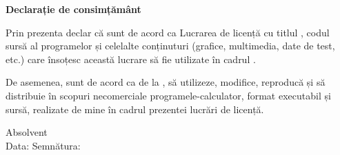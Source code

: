 \vspace*{\fill}
\begin{center}
    \large
    \textbf{Declarație de consimțământ}
\end{center}

Prin prezenta declar că sunt de acord ca Lucrarea de licență cu titlul \textbf{\thesistitle}, codul sursă al programelor și celelalte conținuturi (grafice, multimedia, date de test, etc.) care însoțesc această lucrare să fie utilizate în cadrul \facultyg.

De asemenea, sunt de acord ca \faculty \space de la \university, să utilizeze, modifice, reproducă și să distribuie în scopuri necomerciale programele-calculator, format executabil și sursă, realizate de mine în cadrul prezentei lucrări de licență.

\begin{flushright}
    Absolvent \textbf{\authornamefl} \\
    \vspace{0.5cm}
    Data: \dottedline \hspace{6cm} Semnătura: \dottedline
\end{flushright}
\vspace*{\fill}
\pagebreak